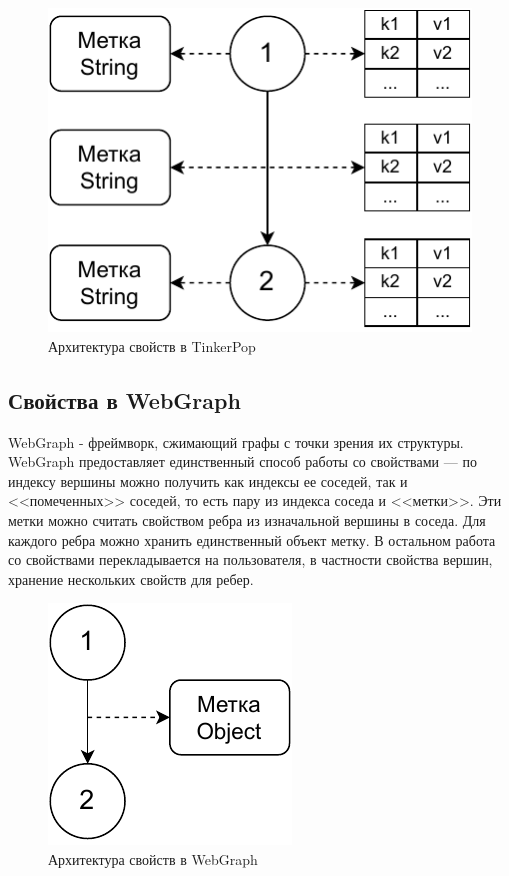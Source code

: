 \documentclass[times,specification,annotation]{itmo-student-thesis}
\begin{document}
\begin{figure}[!h]
\caption{Архитектура свойств в TinkerPop}\label{fig2}
\centering
\includegraphics{img/tinker-props.pdf}
\end{figure}

\subsection{Свойства в WebGraph}

WebGraph - фреймворк, сжимающий графы с точки зрения их структуры. WebGraph предоставляет единственный способ работы со свойствами --- по индексу вершины можно получить как индексы ее соседей, так и <<помеченных>> соседей, то есть пару из индекса соседа и <<метки>>.
Эти метки можно считать свойством ребра из изначальной вершины в соседа. Для каждого ребра можно хранить единственный объект метку. В остальном работа со свойствами перекладывается на пользователя, в частности свойства вершин, хранение нескольких свойств для ребер.

\begin{figure}[!h]
\caption{Архитектура свойств в WebGraph}\label{fig3}
\centering
\includegraphics{img/webgraph-props.pdf}
\end{figure}
\end{document}

